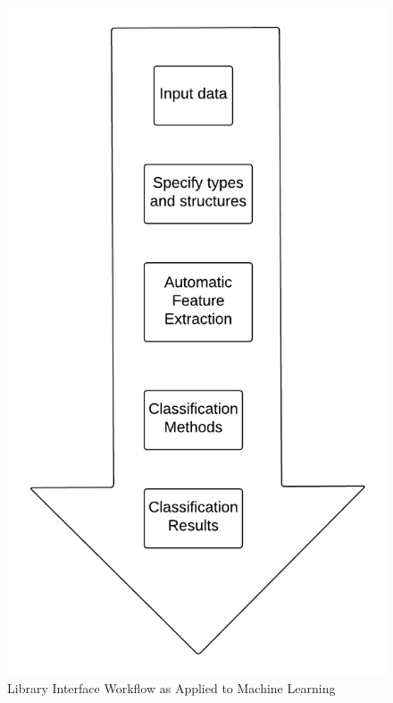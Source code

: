 \documentclass{sig-alternate}
\begin{document}
\begin{figure}[H]
	\begin{center}
		\includegraphics[width=0.75\linewidth]{ourworkflow}
	\end{center}
	\vspace{-12pt}
	\caption{Library Interface Workflow as Applied to Machine Learning}
	\label{fig:ourworkflow}
\end{figure}
\end{document}
